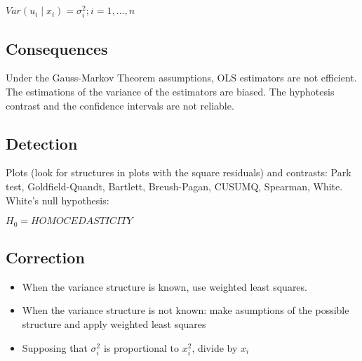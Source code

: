 \documentclass[10pt,landscape]{article}
\begin{document}
\begin{multicols}{3}
$Var(u_i \mid x_i) = \sigma_i^2; i = 1, ..., n$

\subsection*{Consequences}
Under the Gauss-Markov Theorem assumptions, OLS estimators are not efficient. The estimations of the variance of the estimators are biased. The hyphotesis contrast and the confidence intervals are not reliable.
\subsection*{Detection}
Plots (look for structures in plots with the square residuals) and contrasts: Park test, Goldfield-Quandt, Bartlett, Breush-Pagan, CUSUMQ, Spearman, White.
White's null hypothesis:

$H_0 = HOMOCEDASTICITY$

\subsection*{Correction}
\begin{itemize}
	\item When the variance structure is known, use weighted least squares.
	\item When the variance structure is not known: make asumptions of the possible structure and apply weighted least squares
	\item Supposing that $\sigma_i^2$ is proportional to $x_i^2$, divide by $x_i$
\end{itemize}

\end{multicols}
\end{document}
